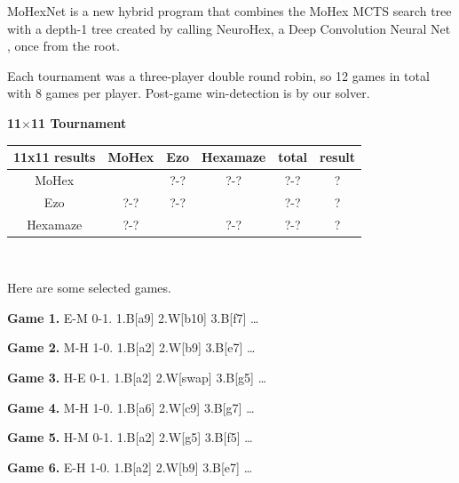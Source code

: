 \documentclass{icga}
\newif\iflong\longfalse  %
\def\Eo{\mbox{\sc Ezo}}
\def\Hz{\mbox{\sc Hexamaze}}
\def\Mx{\mbox{\sc MoHex}}
\def\Mt{\mbox{\sc MoHexNet}}
\def\Nx{\mbox{\sc NeuroHex}}
\begin{document}
\Mt{} is a new hybrid program that combines
the \Mx{} MCTS search tree with a 
depth-1 tree created by calling \Nx{}, 
a Deep Convolution Neural Net , once from the root.

Each tournament was a three-player double round robin, so 12 games
in total with 8 games per player.
Post-game win-detection is by our solver.

{\large\bf 11$\times$11 Tournament}

\hfill\begin{tabular}{|c|c|c|c|c|c|}
\hline 11x11 results &\Mx{} &\Eo{} & \Hz{}     & total & result \\ 
\hline \Mx{} &      &  ?-?    &  ?-?      & ?-?  &  ? \\
\hline \Eo{} &  ?-? &  ?-?    &           & ?-?  &  ? \\
\hline \Hz{} &  ?-? &         &  ?-?      & ?-?  &  ? \\
\hline
\end{tabular}\hfill~

Here are some selected games.
\iflong
This is the longer version, so we include all games.
\fi

{\bf Game 1.}
{\sc E-M 0-1.}
1.B[a9] 2.W[b10] 3.B[f7] \ldots ~ ~ 

{\bf Game 2.}
{\sc M-H 1-0.}
1.B[a2] 2.W[b9] 3.B[e7] \ldots ~ ~ 

{\bf Game 3.}
{\sc H-E 0-1.}
1.B[a2] 2.W[swap] 3.B[g5] \ldots ~ ~ 

{\bf Game 4.}
{\sc M-H 1-0.}
1.B[a6] 2.W[c9] 3.B[g7] \ldots ~ ~ 

{\bf Game 5.}
{\sc H-M 0-1.}
1.B[a2] 2.W[g5] 3.B[f5] \ldots ~ ~ 

{\bf Game 6.}
{\sc E-H 1-0.}
1.B[a2] 2.W[b9] 3.B[e7] \ldots ~ ~ 
\end{document}
